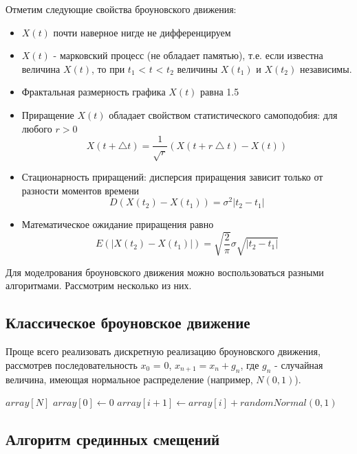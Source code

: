Отметим следующие свойства броуновского движения:
\begin{itemize} 
	\item $X(t)$ почти наверное нигде не дифференцируем 
	\item  $X(t)$ - марковский процесс (не обладает памятью), т.е. если известна величина $X(t)$, то при $t_1$ < $t$ < $t_2$ величины $X(t_1)$ и $X(t_2)$ независимы.
	\item Фрактальная размерность графика $X(t)$ равна 1.5
	\item Приращение $X(t)$ обладает свойством статистического самоподобия: для любого $r > 0$
	\begin{equation}
		X(t+ \bigtriangleup t) = \frac{1}{\sqrt{r}}(X(t+r\bigtriangleup t) - X(t))
	\end{equation}
	\item Стационарность приращений: дисперсия приращения зависит только от разности моментов времени
	\begin{equation} \label{1.6}
		D(X(t_2) - X(t_1)) = \sigma^2|t_2-t_1|
	\end{equation}
	\item Математическое ожидание приращения равно
	\begin{equation}
		E(|X(t_2) - X(t_1)|) = \sqrt{\frac{2}{\pi}}\sigma\sqrt{|t_2-t_1|}
	\end{equation}
\end{itemize}

Для моделрования броуновского движения можно воспользоваться разными алгоритмами. Рассмотрим несколько из них.

\subsection{Классическое броуновское движение}

Проще всего реализовать дискретную реализацию броуновского движения, рассмотрев последовательность $x_0$ = 0, $x_{n+1} = x_n + g_n$, где $g_n$ - случайная величина, имеющая нормальное распределение (например, $N(0,1)$).

\begin{algorithmic}[1]
	\State $array[N]$
	\State $array[0]\gets 0$
	\State $array[i+1]\gets array[i] + randomNormal(0,1)$
	\EndFor
\end{algorithmic}

\subsection{Алгоритм срединных смещений}

